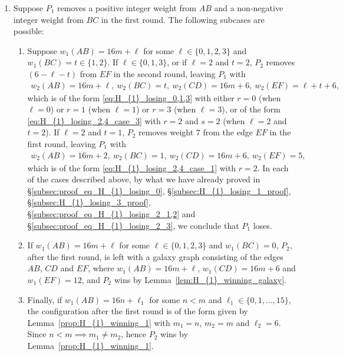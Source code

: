 \documentclass[11pt,reqno]{amsart}
\theoremstyle{definition}
\theoremstyle{definition}
\begin{document}
\begin{enumerate}
\item Suppose $P_{1}$ removes a positive integer weight from $AB$ and a non-negative integer weight from $BC$ in the first round. The following subcases are possible:
\begin{enumerate}
\item Suppose $w_{1}(AB)=16m+\ell$ for some $\ell \in \{0,1,2,3\}$ and $w_{1}(BC)=t\in\{1,2\}$. If $\ell \in \{0,1,3\}$, or if $\ell=2$ and $t=2$, $P_{2}$ removes $(6-\ell-t)$ from $EF$ in the second round, leaving $P_{1}$ with
\begin{align}
w_{2}(AB)=16m+\ell,\ w_{2}(BC)=t,\ w_{2}(CD)=16m+6,\ w_{2}(EF)=\ell+t+6,\nonumber
\end{align}
which is of the form \eqref{eq:H_{1}_losing_0,1,3} with either $r=0$ (when $\ell=0$) or $r=1$ (when $\ell=1$) or $r=3$ (when $\ell=3$), or of the form \eqref{eq:H_{1}_losing_2,4_case_3} with $r=2$ and $s=2$ (when $\ell=2$ and $t=2$). If $\ell=2$ and $t=1$, $P_{2}$ removes weight $7$ from the edge $EF$ in the first round, leaving $P_{1}$ with
\begin{align}
w_{2}(AB)=16m+2,\ w_{2}(BC)=1,\ w_{2}(CD)=16m+6,\ w_{2}(EF)=5,\nonumber
\end{align}
which is of the form \eqref{eq:H_{1}_losing_2,4_case_1} with $r=2$. In each of the cases described above, by what we have already proved in \S\ref{subsec:proof_eq_H_{1}_losing_0}, \S\ref{subsec:H_{1}_losing_1_proof}, \S\ref{subsec:H_{1}_losing_3_proof}, \S\ref{subsec:proof_eq_H_{1}_losing_2_1,2} and \S\ref{subsec:proof_eq_H_{1}_losing_2_3}, we conclude that $P_{1}$ loses.

\item If $w_{1}(AB)=16m+\ell$ for some $\ell \in \{0,1,2,3\}$ and $w_{1}(BC)=0$, $P_{2}$, after the first round, is left with a galaxy graph consisting of the edges $AB$, $CD$ and $EF$, where $w_{1}(AB)=16m+\ell$, $w_{1}(CD)=16m+6$ and $w_{1}(EF)=12$, and $P_{2}$ wins by Lemma~\ref{lem:H_{1}_winning_galaxy}.

\item Finally, if $w_{1}(AB)=16n+\ell_{1}$ for some $n < m$ and $\ell_{1} \in \{0,1,\ldots,15\}$, the configuration after the first round is of the form given by Lemma~\ref{prop:H_{1}_winning_1} with $m_{1}=n$, $m_{2}=m$ and $\ell_{2}=6$. Since $n<m \implies m_{1}\neq m_{2}$, hence $P_{2}$ wins by Lemma~\ref{prop:H_{1}_winning_1}.
\end{enumerate}


\end{enumerate}
\end{document}
